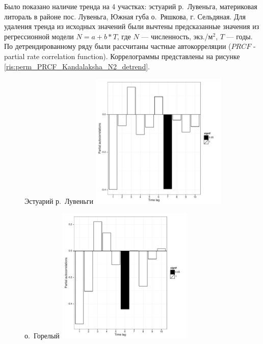 Было показано наличие тренда на 4 участках: эстуарий р.~Лувеньга, материковая литораль в районе пос. Лувеньга, Южная губа о.~Ряшкова, г. Сельдяная.
Для удаления тренда из исходных значений были вычтены предсказанные значения из регрессионной модели $N = a + b*T$, где $N$ --- численность, экз./м$^2$, $T$ --- годы.
По детрендированному ряду были рассчитаны частные автокорреляции ($PRCF$ - partial rate correlation function).  
Коррелограммы представлены на рисунке \ref{ris:perm_PRCF_Kandalaksha_N2_detrend}.
	\begin{figure}[ht]
	
	\begin{minipage}[b]{.46\linewidth}
	\begin{center}
	{\footnotesize Эстуарий р.~Лувеньги}
		\includegraphics[width=65mm]{../White_Sea/dynamic_N_N1/perm_PRCF_Estuary_detrend.pdf}

	\end{center}
	\end{minipage}
		\hfil %
	\begin{minipage}[b]{.46\linewidth}
	\begin{center}
	{\footnotesize о.~Горелый}
		\includegraphics[width=65mm]{../White_Sea/dynamic_N_N1/perm_PRCF_Goreliy_all_detrend.pdf}
	\end{center}
	\end{minipage}


\end{figure}
